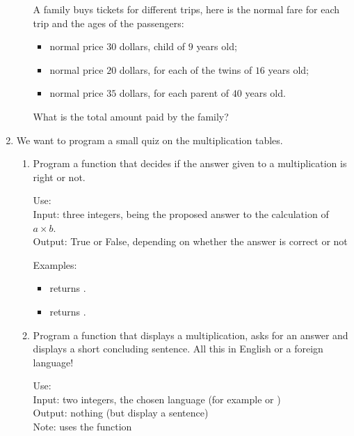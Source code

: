 \documentclass[11pt,class=report,crop=false]{standalone}
\begin{document}
\begin{activite}
\begin{enumerate}
\begin{enumerate}
  A family buys tickets for different trips, here is the normal fare for each trip and the ages of the passengers: 
  \begin{itemize}
    \item normal price $30$ dollars, child of $9$ years old;
    
    \item normal price $20$ dollars, for each of the twins of $16$ years old;
    
    \item normal price $35$ dollars, for each parent of $40$ years old.
  \end{itemize}
  What is the total amount paid by the family?
 
  \end{enumerate}
  
  
  \item We want to program a small quiz on the multiplication tables.
  
  \begin{enumerate}
    \item Program a function  that decides if the answer given to a multiplication is right or not.
    
\begin{fonction}
  Use:  \\
  Input: three integers,  being the proposed answer to the calculation of $a \times b$.\\
  Output: \og{}True\fg{} or \og{}False\fg{}, depending on whether the answer is correct or not
  
  \medskip
    
  Examples: 
  \begin{itemize}
    \item {} returns .
    \item {} returns .
  \end{itemize}
  \end{fonction}  
  
  
    \item Program a function that displays a multiplication, asks for an answer and displays a short concluding sentence. All this in English or a foreign language!
    
\begin{fonction}
  Use:  \\
  Input: two integers, the chosen language (for example  or )\\
  Output: nothing (but display a sentence)\\
  Note: uses the function 
  

\end{fonction}
\end{enumerate}
\end{enumerate}
\end{activite}
\end{document}
